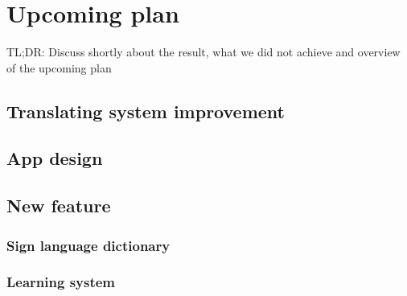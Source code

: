 \chapter{Upcoming plan}

TL;DR: Discuss shortly about the result, what we did not achieve and overview of the upcoming plan

\section{Translating system improvement}

\section{App design}

\section{New feature}

\subsection{Sign language dictionary}

\subsection{Learning system}

